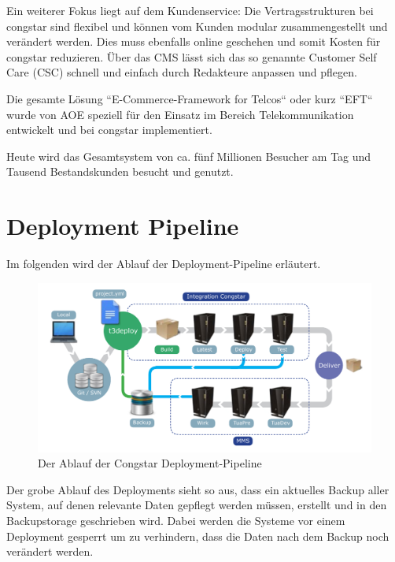 \documentclass[11pt,a4paper]{article} %
\begin{document}
Ein weiterer Fokus liegt auf dem Kundenservice: Die Vertragsstrukturen bei congstar sind flexibel und können vom Kunden modular zusammengestellt und verändert werden. Dies muss ebenfalls online geschehen und somit Kosten für congstar reduzieren. Über das CMS lässt sich das so genannte Customer Self Care (CSC) schnell und einfach durch Redakteure anpassen und pflegen.

Die gesamte Lösung “E-Commerce-Framework for Telcos“ oder kurz “EFT“ wurde von AOE speziell für den Einsatz im Bereich Telekommunikation entwickelt und bei congstar implementiert.

Heute wird das Gesamtsystem von ca. fünf Millionen Besucher am Tag und Tausend Bestandskunden besucht und genutzt.




\section{Deployment Pipeline} \label{sec:pipeline}

Im folgenden wird der Ablauf der Deployment-Pipeline erläutert.

\begin{figure}[H]
\includegraphics[width=\textwidth]{images/DeploymentPipeline.pdf}
\caption{Der Ablauf der Congstar Deployment-Pipeline }
\centering
\end{figure}

Der grobe Ablauf des Deployments sieht so aus, dass ein aktuelles Backup aller System, auf denen relevante Daten gepflegt werden müssen, erstellt und in den Backupstorage geschrieben wird. Dabei werden die Systeme vor einem Deployment gesperrt um zu verhindern, dass die Daten nach dem Backup noch verändert werden.
\end{document}

